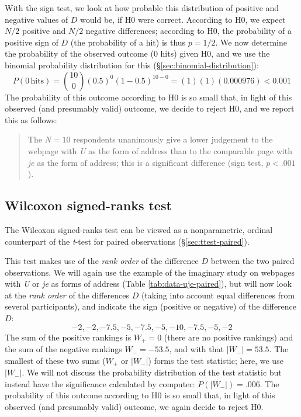 \documentclass[
]{book}
\begin{document}
With the sign test, we look at how probable this distribution of positive and
negative values of \(D\) would be, if H0 were correct. According to
H0, we expect \(N/2\) positive and \(N/2\) negative differences; according to
H0, the probability of a positive sign of \(D\) (the probability of a hit) is thus
\(p=1/2\). We now determine the probability of the observed outcome (0 hits)
given H0, and we use the binomial probability distribution for this
(§\ref{sec:binomial-distribution}):
\begin{equation}
  \label{eq:prob-binom-uje}
    P(0\,\mbox{hits}) = {10 \choose 0} (0.5)^0 (1-0.5)^{10-0} = (1) (1) (0.000976) < 0.001
\end{equation}
The probability of this outcome according to H0 is so small that, in light of this
observed (and presumably valid) outcome, we decide to reject H0, and we report this as
follows:

\begin{quote}
The \(N=10\) respondents unanimously give a lower judgement to the
webpage with \emph{U} as the form of address than to the comparable page
with \emph{je} as the form of address; this is a significant difference
(sign test, \(p<.001\)).
\end{quote}

\subsection{Wilcoxon signed-ranks test}\label{sec:Wilcoxon-signed-rank}

The Wilcoxon signed-ranks test can be viewed as a
nonparametric, ordinal counterpart of the \emph{t}-test for paired
observations (§\ref{sec:ttest-paired}).

This test makes use of the \emph{rank order} of the difference \(D\) between
the two paired observations. We will again use the example of the imaginary
study on webpages with \emph{U} or \emph{je} as forms of
address
(Table \ref{tab:data-uje-paired}), but will now look at the \emph{rank order}
of the differences \(D\) (taking into account equal differences from several
participants), and indicate the sign (positive or
negative) of the difference \(D\):
\[-2, -2, -7.5, -5, -7.5, -5, -10, -7.5, -5, -2\]
The sum of the positive rankings is \(W_+=0\) (there are no positive rankings)
and the sum of the negative rankings \(W_-= -53.5\), and with that \(|W_-|=53.5\).
The smallest of
these two sums (\(W_+\) or \(|W_-|\)) forms the test statistic; here, we use
\(|W_-|\).
We will not discuss the probability distribution of the test statistic
but instead have the significance calculated by computer: \(P(|W_-|)=.006\). The
probability of this outcome according to H0 is so small that, in light of this
observed (and presumably valid)
outcome, we again decide to reject H0.
\end{document}
